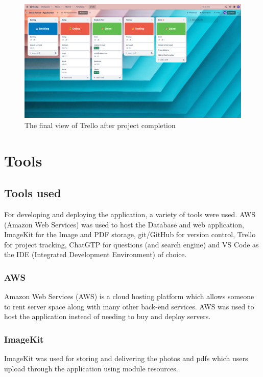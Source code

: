 \begin{figure}[H]
    \centering
    \includegraphics[scale=0.20]{images/trello_final.png}
    \caption{The final view of Trello after project completion}
    \label{fig:my_label}
\end{figure}

\section{Tools}

\subsection{Tools used}

For developing and deploying the application, a variety of tools were used. AWS (Amazon Web Services) was used to host the Database and web application, ImageKit for the Image and PDF storage, git/GitHub for version control, Trello for project tracking, ChatGTP for questions (and search engine) and VS Code as the IDE (Integrated Development Environment) of choice.

\subsubsection{AWS}

Amazon Web Services (AWS) is a cloud hosting platform which allows someone to rent server space along with many other back-end services. AWS was used to host the application instead of needing to buy and deploy servers.

\subsubsection{ImageKit}

ImageKit was used for storing and delivering the photos and pdfs which users upload through the application using module resources.

